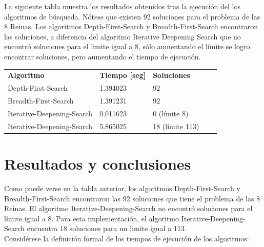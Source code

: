 \documentclass[letter, 10pt]{article}
\begin{document}
La siguiente tabla muestra los resultados obtenidos tras la ejecución del los algoritmos de búsqueda. Nótese que existen 92 soluciones para el problema de las 8 Reinas. Los algoritmos Depth-First-Search y Breadth-First-Search encontraron las soluciones, a diferencia del algoritmo Iterative Deepening Search que no encontró soluciones para el limite igual a 8, sólo aumentando el límite se logro encontrar soluciones, pero aumentando el tiempo de ejecución.

\begin{table}[H]
    \centering
    \begin{tabular}{|l|l|l|ll}
    \cline{1-3}
    \textbf{Algoritmo}              & \textbf{Tiempo [seg]} & \textbf{Soluciones} &  &  \\ \cline{1-3}
        Depth-First-Search          & 1.394023              & 92                  & &  \\ \cline{1-3}
        Breadth-First-Search        & 1.391231              & 92                  & &  \\ \cline{1-3}
        Iterative-Deepening-Search  & 0.011623              & 0 (límite 8)        & &  \\ \cline{1-3}
        Iterative-Deepening-Search  & 5.865025              & 18 (límite 113)     & &  \\ \cline{1-3}
    \end{tabular}
\end{table}


\section{Resultados y conclusiones}

Como puede verse en la tabla anterior, los algoritmos Depth-First-Search y Breadth-First-Search encontraron las 92 soluciones que tiene el problema de las 8 Reinas. El algoritmo Iterative-Deepening-Search no encontró soluciones para el límite igual a 8. Para esta implementación, el algoritmo Iterative-Deepening-Search encuentra 18 soluciones para un limite igual a 113. \\

Considérese la definición formal de los tiempos de ejecución de los algoritmos:\\
\end{document}
